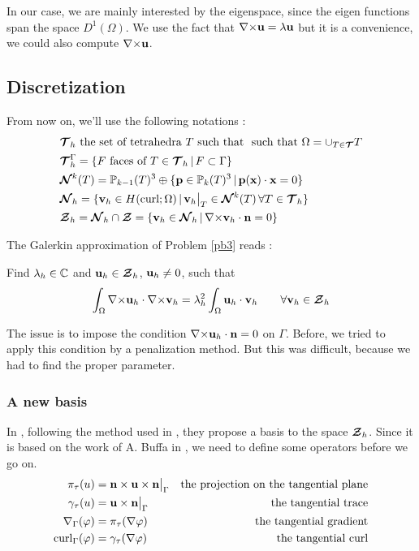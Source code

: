 \begin{rk}
In our case, we are mainly interested by the eigenspace, since the
eigen functions span the space $D^1(\Omega)$. We use the fact that
${\nabla\times}{\mathbf{u}}=\lambda{\mathbf{u}}$ but it is a convenience, we could
also compute ${\nabla\times}{\mathbf{u}}$.
\end{rk}

\subsection{Discretization}
From now on, we'll use the following notations :
\begin{align*}
&{\bm{\mathcal{T}}}_h\mbox{ the set of tetrahedra } T \mbox{ such that }
\mbox{ such that } \Omega=\cup_{T\in{\bm{\mathcal{T}}}}T\\
&{\bm{\mathcal{T}}}_h^\Gamma =\{F\mbox{ faces of } T\in {\bm{\mathcal{T}}}_h \,|\, F\subset \Gamma
\}\\
&{\bm{\mathcal{N}}}^k(T)={\mathbb{P}}_{k-1}(T)^3\oplus\{{\mathbf{p}}\in{\mathbb{P}}_k(T)^3 \,|\,
{\mathbf{p(x)}}\cdot{\mathbf{x}}=0 \}\\
&{\bm{\mathcal{N}}}_h=\{{\mathbf{v}}_h\in H(\mathrm{curl};\Omega) \,|\,
{\mathbf{v}}_h{\big\rvert_{T}}\in{\bm{\mathcal{N}}}^k(T)\, \forall T\in {\bm{\mathcal{T}}}_h \}\\
&{\bm{\mathcal{Z}}}_h={\bm{\mathcal{N}}}_h\cap{\bm{\mathcal{Z}}}=\{{\mathbf{v}}_h\in{\bm{\mathcal{N}}}_h \,|\,
{\nabla\times}{\mathbf{v}}_h\cdot{\mathbf{n}} = 0 \}
\end{align*}

The Galerkin approximation of Problem \ref{pb3} reads :
\begin{pb}\label{pb4}
Find $\lambda_h\in{\mathbb{C}}$ and ${\mathbf{u}}_h\in{\bm{\mathcal{Z}}}_h$, ${\mathbf{u}}_h\ne
0$, such that
\[\int_\Omega {\nabla\times}{\mathbf{u}}_h\cdot{\nabla\times}{\mathbf{v}}_h =
\lambda_h^2\int_\Omega {\mathbf{u}}_h\cdot{\mathbf{v}}_h \quad\quad
\forall{\mathbf{v}}_h\in{\bm{\mathcal{Z}}}_h \]
\end{pb}

The issue is to impose the condition
${\nabla\times}{\mathbf{u}}_h\cdot{\mathbf{n}}=0$ on $\Gamma$. Before, we tried to apply this
condition by a penalization method. But this was difficult, because we had to
find the proper parameter.\\

\subsubsection{A new basis}
In \cite{Venegas2013}, following the method used in
\cite{Meddahi2003,Salgado2005}, they propose a basis to the space ${\bm{\mathcal{Z}}}_h$.
Since it is based on the work of A. Buffa in \cite{Buffa2002845}, we need to
define some operators before we go on.
\begin{align*}
\pi_\tau(u) &= {\mathbf{n}}\times{\mathbf{u}}\times{\mathbf{n}}{\big\rvert_{\Gamma}} &\mbox{the projection on
  the tangential plane}\\
\gamma_\tau(u) &= {\mathbf{u}}\times{\mathbf{n}}{\big\rvert_{\Gamma}} &\mbox{the tangential
  trace}\\
{\nabla}_\Gamma(\varphi) &= \pi_\tau({\nabla}\varphi) &\mbox{the tangential gradient}\\
\mathrm{curl}_\Gamma(\varphi) &= \gamma_\tau({\nabla}\varphi) &\mbox{the tangential curl}
\end{align*}

